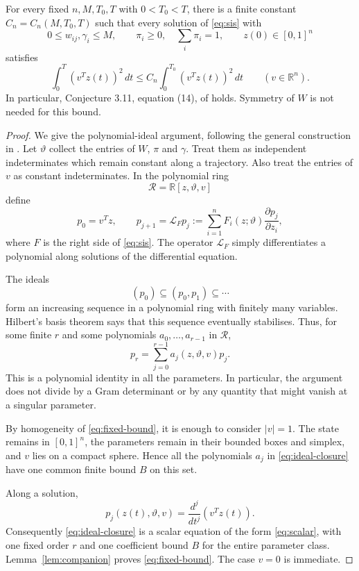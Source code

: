 \begin{theorem}
\label{thm:fixed}
For every fixed $n,M,T_0,T$ with $0<T_0<T$, there is a finite constant $C_n=C_n(M,T_0,T)$ such that every solution of \eqref{eq:sis} with
\[
 0\leq w_{ij},\gamma_i\leq M,\qquad
 \pi_i\geq0,\quad\sum_i\pi_i=1,\qquad z(0)\in[0,1]^n
\]
satisfies
\begin{equation}
 \int_0^T(v^Tz(t))^2\,dt
 \leq C_n\int_0^{T_0}(v^Tz(t))^2\,dt
 \qquad(v\in\mathbb R^n).
 \label{eq:fixed-bound}
\end{equation}
In particular, Conjecture 3.11, equation (14), of \cite{KH2026} holds. Symmetry of $W$ is not needed for this bound.
\end{theorem}

\begin{proof}
We give the polynomial-ideal argument, following the general construction in \cite[Sections 2.2--2.3]{NY1999}. Let $\vartheta$ collect the entries of $W$, $\pi$ and $\gamma$. Treat them as independent indeterminates which remain constant along a trajectory. Also treat the entries of $v$ as constant indeterminates. In the polynomial ring
\[
 \mathcal R=\mathbb R[z,\vartheta,v]
\]
define
\[
 p_0=v^Tz,\qquad
 p_{j+1}=\mathcal L_Fp_j
 :=\sum_{i=1}^nF_i(z;\vartheta)\frac{\partial p_j}{\partial z_i},
\]
where $F$ is the right side of \eqref{eq:sis}. The operator $\mathcal L_F$ simply differentiates a polynomial along solutions of the differential equation.

The ideals
\[
 (p_0)\subseteq(p_0,p_1)\subseteq\cdots
\]
form an increasing sequence in a polynomial ring with finitely many variables. Hilbert's basis theorem says that this sequence eventually stabilises. Thus, for some finite $r$ and some polynomials $a_0,\ldots,a_{r-1}$ in $\mathcal R$,
\begin{equation}
 p_r=\sum_{j=0}^{r-1}a_j(z,\vartheta,v)p_j.
 \label{eq:ideal-closure}
\end{equation}
This is a polynomial identity in all the parameters. In particular, the argument does not divide by a Gram determinant or by any quantity that might vanish at a singular parameter.

By homogeneity of \eqref{eq:fixed-bound}, it is enough to consider $|v|=1$. The state remains in $[0,1]^n$, the parameters remain in their bounded boxes and simplex, and $v$ lies on a compact sphere. Hence all the polynomials $a_j$ in \eqref{eq:ideal-closure} have one common finite bound $B$ on this set.

Along a solution,
\[
 p_j(z(t),\vartheta,v)=\frac{d^j}{dt^j}(v^Tz(t)).
\]
Consequently \eqref{eq:ideal-closure} is a scalar equation of the form \eqref{eq:scalar}, with one fixed order $r$ and one coefficient bound $B$ for the entire parameter class. Lemma~\ref{lem:companion} proves \eqref{eq:fixed-bound}. The case $v=0$ is immediate.
\end{proof}

